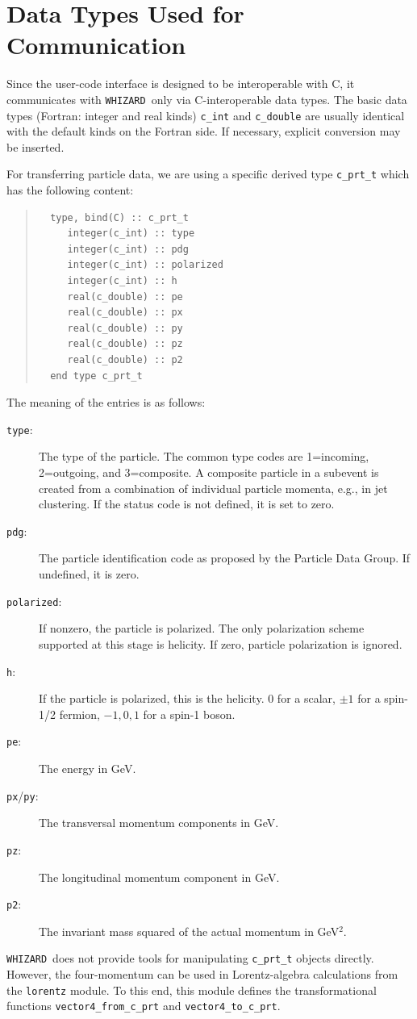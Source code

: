 \documentclass[12pt]{book}
\newcommand{\ttt}[1]{\texttt{#1}}
\newcommand{\whizard}{\texttt{WHIZARD}}
\begin{document}
\section{Data Types Used for Communication}
\label{sec:c_prt}

Since the user-code interface is designed to be interoperable with C,
it communicates with \whizard\ only via C-interoperable data types.
The basic data types (Fortran: integer and real kinds) \ttt{c\_int}
and \ttt{c\_double} are usually identical with the default kinds on
the Fortran side.  If necessary, explicit conversion may be inserted.

For transferring particle data, we are using a specific derived type
\ttt{c\_prt\_t} which has the following content:
\begin{quote}
\begin{footnotesize}
\begin{verbatim}
  type, bind(C) :: c_prt_t
     integer(c_int) :: type
     integer(c_int) :: pdg
     integer(c_int) :: polarized
     integer(c_int) :: h
     real(c_double) :: pe
     real(c_double) :: px
     real(c_double) :: py
     real(c_double) :: pz
     real(c_double) :: p2
  end type c_prt_t
\end{verbatim}
\end{footnotesize}
\end{quote}
The meaning of the entries is as follows:
\begin{description}
\item[\ttt{type}:] The type of the particle.  The common type
  codes are 1=incoming, 2=outgoing, and 3=composite.  A composite
  particle in a subevent is created from a combination of individual
  particle momenta, e.g., in jet clustering.  If the status code is
  not defined, it is set to zero.
\item[\ttt{pdg}:] The particle identification code as proposed by the
  Particle Data Group.  If undefined, it is zero.
\item[\ttt{polarized}:] If nonzero, the particle is polarized.  The
  only polarization scheme supported at this stage is helicity.  If
  zero, particle polarization is ignored.
\item[\ttt{h}:] If the particle is polarized, this is the helicity.  $0$
  for a scalar, $\pm 1$ for a spin-1/2 fermion, $-1,0,1$ for a spin-1
  boson.
\item[\ttt{pe}:] The energy in GeV.
\item[\ttt{px}/\ttt{py}:] The transversal momentum components in GeV.
\item[\ttt{pz}:] The longitudinal momentum component in GeV.
\item[\ttt{p2}:] The invariant mass squared of the actual momentum in GeV$^2$.
\end{description}
\whizard\ does not provide tools for manipulating \ttt{c\_prt\_t}
objects directly.  However, the four-momentum can be used in
Lorentz-algebra calculations from the \ttt{lorentz} module.  To this
end, this module defines the transformational functions
\ttt{vector4\_from\_c\_prt} and \ttt{vector4\_to\_c\_prt}.
\end{document}
